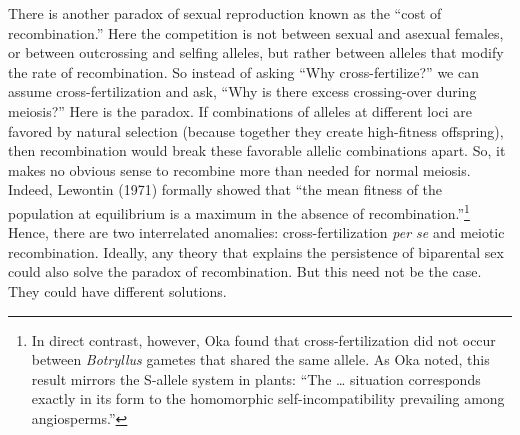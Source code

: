 \documentclass[
  letterpaper,
]{book}
\begin{document}
There is another paradox of sexual reproduction known as the ``cost of
recombination.'' Here the competition is not between sexual and asexual
females, or between outcrossing and selfing alleles, but rather between
alleles that modify the rate of recombination. So instead of asking
``Why cross-fertilize?'' we can assume cross-fertilization and ask,
``Why is there excess crossing-over during meiosis?'' Here is the
paradox. If combinations of alleles at different loci are favored by
natural selection (because together they create high-fitness offspring),
then recombination would break these favorable allelic combinations
apart. So, it makes no obvious sense to recombine more than needed for
normal meiosis. Indeed, Lewontin (1971) formally showed that ``the mean
fitness of the population at equilibrium is a maximum in the absence of
recombination.''\footnote{In direct contrast, however, Oka found that
  cross-fertilization did not occur between \emph{Botryllus} gametes
  that shared the same allele. As Oka noted, this result mirrors the
  S-allele system in plants: ``The \ldots{} situation corresponds
  exactly in its form to the homomorphic self-incompatibility prevailing
  among angiosperms.''} Hence, there are two interrelated anomalies:
cross-fertilization \emph{per se} and meiotic recombination. Ideally,
any theory that explains the persistence of biparental sex could also
solve the paradox of recombination. But this need not be the case. They
could have different solutions.
\end{document}
